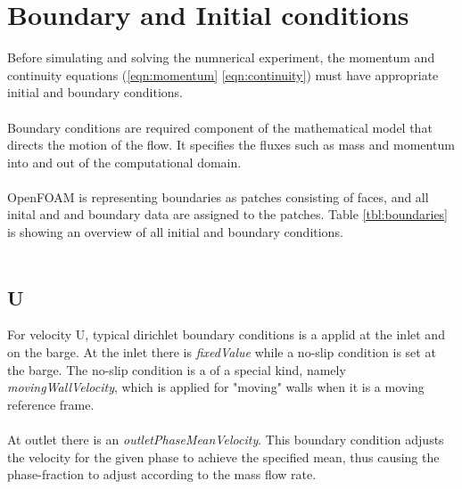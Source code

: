 \documentclass[a4paper, 12pt]{report}
\begin{document}
\section{Boundary and Initial conditions}
Before simulating and solving the numnerical experiment, the momentum and continuity equations (\ref{eqn:momentum} \ref{eqn:continuity}) must have appropriate initial and boundary conditions.\\
\\
Boundary conditions are required component of the mathematical model that directs the motion of the flow. It specifies the fluxes such as mass and momentum into and out of the computational domain.\\
\\
OpenFOAM is representing boundaries as patches consisting of faces, and all inital and and boundary data are assigned to the patches. Table \ref{tbl:boundaries} is showing an overview of all initial and boundary conditions.\\
\\
\subsection{U}
For velocity U, typical dirichlet boundary conditions is a applid at the inlet and on the barge. At the inlet there is \textit{fixedValue}  while a no-slip condition is set at the barge. The no-slip condition is a of a special kind, namely \textit{movingWallVelocity}, which is applied for "moving" walls when it is a moving reference frame.\\
\\
At outlet there is an \textit{outletPhaseMeanVelocity}. This boundary condition adjusts the velocity for the given phase to achieve the specified mean, thus causing the phase-fraction to adjust according to the mass flow rate.\\
\\
\end{document}
